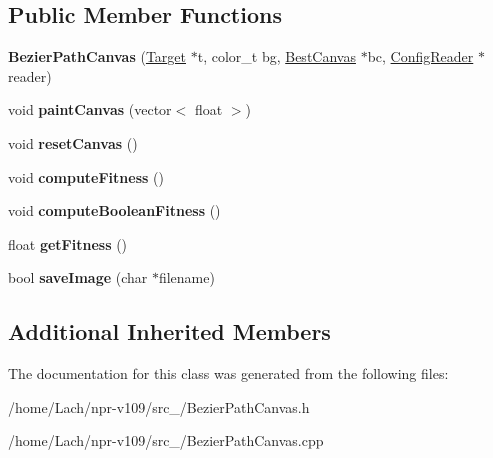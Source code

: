 \subsection*{Public Member Functions}
\begin{DoxyCompactItemize}
\item 
\hypertarget{classBezierPathCanvas_ae24f243f5019dbd8fcab3312ffbf1188}{}\label{classBezierPathCanvas_ae24f243f5019dbd8fcab3312ffbf1188} 
{\bfseries Bezier\+Path\+Canvas} (\hyperlink{classTarget}{Target} $\ast$t, color\+\_\+t bg, \hyperlink{classBestCanvas}{Best\+Canvas} $\ast$bc, \hyperlink{classConfigReader}{Config\+Reader} $\ast$reader)
\item 
\hypertarget{classBezierPathCanvas_a416fa47f6b5cdac2bfb97851da5d14f7}{}\label{classBezierPathCanvas_a416fa47f6b5cdac2bfb97851da5d14f7} 
void {\bfseries paint\+Canvas} (vector$<$ float $>$)
\item 
\hypertarget{classBezierPathCanvas_a9cbaaad5348b95398638c82e899603d6}{}\label{classBezierPathCanvas_a9cbaaad5348b95398638c82e899603d6} 
void {\bfseries reset\+Canvas} ()
\item 
\hypertarget{classBezierPathCanvas_a2262510eb3b0f95754b10c6baae55373}{}\label{classBezierPathCanvas_a2262510eb3b0f95754b10c6baae55373} 
void {\bfseries compute\+Fitness} ()
\item 
\hypertarget{classBezierPathCanvas_a5c875f0efc1936e6d87b32a4846ff890}{}\label{classBezierPathCanvas_a5c875f0efc1936e6d87b32a4846ff890} 
void {\bfseries compute\+Boolean\+Fitness} ()
\item 
\hypertarget{classBezierPathCanvas_a2baf50cc95bdf9a2de442ae38bb586fb}{}\label{classBezierPathCanvas_a2baf50cc95bdf9a2de442ae38bb586fb} 
float {\bfseries get\+Fitness} ()
\item 
\hypertarget{classBezierPathCanvas_a4f96f789b6ab895d3efb05fd6de199d6}{}\label{classBezierPathCanvas_a4f96f789b6ab895d3efb05fd6de199d6} 
bool {\bfseries save\+Image} (char $\ast$filename)
\end{DoxyCompactItemize}
\subsection*{Additional Inherited Members}


The documentation for this class was generated from the following files\+:\begin{DoxyCompactItemize}
\item 
/home/\+Lach/npr-\/v109/src\+\_/Bezier\+Path\+Canvas.\+h\item 
/home/\+Lach/npr-\/v109/src\+\_/Bezier\+Path\+Canvas.\+cpp\end{DoxyCompactItemize}
